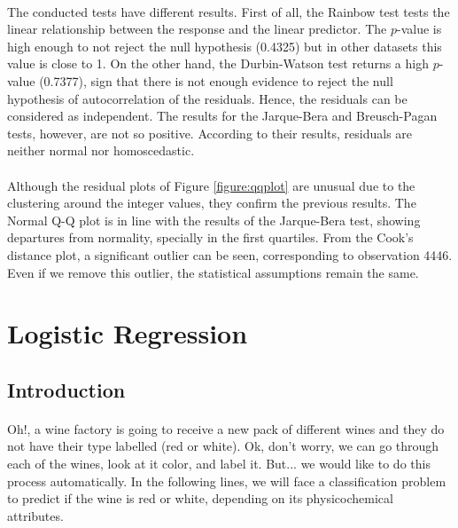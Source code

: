 \documentclass[10pt]{article}
\begin{document}
\paragraph*{}
The conducted tests have different results. First of all, the Rainbow test tests the linear relationship between the response and the linear predictor. The $p$-value is high enough to not reject the null hypothesis (0.4325) but in other datasets this value is close to 1. On the other hand, the Durbin-Watson test returns a high $p$-value (0.7377), sign that there is not enough evidence to reject the null hypothesis of autocorrelation of the residuals. Hence, the residuals can be considered as independent. The results for the Jarque-Bera and Breusch-Pagan tests, however, are not so positive. According to their results, residuals are neither normal nor homoscedastic.

\paragraph*{}
Although the residual plots of Figure \ref{figure:qqplot} are unusual due to the clustering around the integer values, they confirm the previous results. The Normal Q-Q plot is in line with the results of the Jarque-Bera test, showing departures from normality, specially in the first quartiles. From the Cook's distance plot, a significant outlier can be seen, corresponding to observation 4446. Even if we remove this outlier, the statistical assumptions remain the same.
\section{Logistic Regression}

\subsection{Introduction}


\paragraph*{}
Oh!, a wine factory is going to receive a new pack of different wines and they do not have their type labelled (red or white). Ok, don't worry, we can go through each of the wines, look at it color, and label it. But... we would like to do this process automatically.  In the following lines, we will face a classification problem to predict if the wine is red or white, depending on its physicochemical attributes. 
\end{document}
